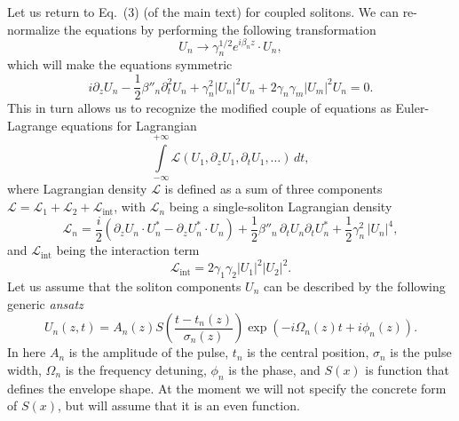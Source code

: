 \documentclass[aps, pra, signlecolumn, superscriptaddress, final, 11pt]{revtex4}
\newcommand{\abs}[1]{\left| #1 \right|}
\begin{document}
Let us return to Eq.~(3) (of the main text) for coupled solitons. We can re-normalize the equations by performing the following transformation
\begin{equation*}
  U_{n} \to \gamma_{n}^{1/2} e^{i \beta_{n} z} \cdot U_{n},
\end{equation*}
which will make the equations symmetric
\begin{equation*}
  i \partial_{z} U_{n}
    - \frac{1}{2} \beta''_{n} \partial_{t}^{2} U_{n}
    + \gamma_{n}^{2} \abs{U_{n}}^{2} U_{n}
    + 2 \gamma_{n} \gamma_{m} \abs{U_{m}}^{2} U_{n} = 0.
\end{equation*}
This in turn allows us to recognize the modified couple of equations as Euler-Lagrange equations for Lagrangian
\begin{equation*}
  \int \limits_{-\infty}^{+\infty}
    \mathcal{L}(U_{1}, \partial_{z} U_{1}, \partial_{t} U_{1}, \ldots)
    \, dt,
\end{equation*}
where Lagrangian density $\mathcal{L}$ is defined as a sum of three components $\mathcal{L} = \mathcal{L}_{1} + \mathcal{L}_{2} + \mathcal{L}_{\text{int}}$, with $\mathcal{L}_{n}$ being a single-soliton Lagrangian density
\begin{equation}
  \label{eq:SingleSolitonLagrangianDensity}
  \mathcal{L}_{n} =
  \frac{i}{2} \left(
    \partial_{z} U_{n} \cdot U_{n}^{*} -
    \partial_{z} U_{n}^{*} \cdot U_{n}
  \right)
  + \frac{1}{2} \beta''_{n} \, \partial_{t} U_{n} \partial_{t} U_{n}^{*}
  + \frac{1}{2} \gamma_{n}^{2} \, \abs{U_{n}}^{4},
\end{equation}
and $\mathcal{L}_{\text{int}}$ being the interaction term
\begin{equation}
  \label{eq:InteractionLagrangianDensity}
  \mathcal{L}_{\text{int}} =
    2 \gamma_{1} \gamma_{2}
    \abs{U_{1}}^{2} \abs{U_{2}}^{2}.
\end{equation}
Let us assume that the soliton components $U_{n}$ can be described by the following generic \textit{ansatz}
\begin{equation}
  \label{eq:SolitonAnsatz}
  U_{n}(z, t) = A_{n}(z) S\left(
    \frac{t - t_{n}(z)}{\sigma_{n}(z)}
  \right) \exp\left(
    - i \Omega_{n}(z) t + i \phi_{n}(z)
  \right).
\end{equation}
In here $A_{n}$ is the amplitude of the pulse, $t_{n}$ is the central position, $\sigma_{n}$ is the pulse width, $\Omega_{n}$ is the frequency detuning, $\phi_{n}$ is the phase, and $S(x)$ is function that defines the envelope shape. At the moment we will not specify the concrete form of $S(x)$, but will assume that it is an even function.
\end{document}
